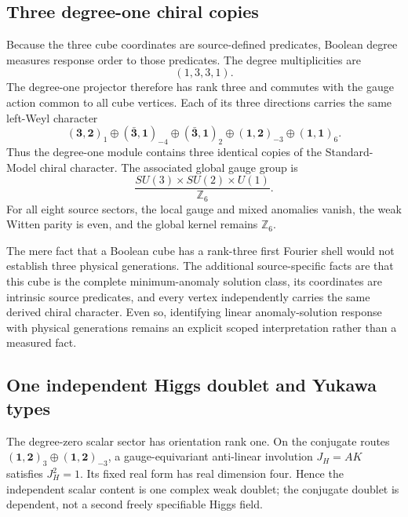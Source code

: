 \documentclass[11pt]{article}
\theoremstyle{definition}
\theoremstyle{remark}
\begin{document}
\subsection{Three degree-one chiral copies}

Because the three cube coordinates are source-defined predicates, Boolean degree measures response order to those predicates. The degree multiplicities are
\begin{equation}
 (1,3,3,1).
\end{equation}
The degree-one projector therefore has rank three and commutes with the gauge action common to all cube vertices. Each of its three directions carries the same left-Weyl character
\begin{equation}
 (\mathbf3,\mathbf2)_1
 \oplus(\bar{\mathbf3},\mathbf1)_{-4}
 \oplus(\bar{\mathbf3},\mathbf1)_2
 \oplus(\mathbf1,\mathbf2)_{-3}
 \oplus(\mathbf1,\mathbf1)_6 .
\end{equation}
Thus the degree-one module contains three identical copies of the Standard-Model chiral character. The associated global gauge group is
\begin{equation}
 \frac{SU(3)\times SU(2)\times U(1)}{\mathbb Z_6}.
\end{equation}
For all eight source sectors, the local gauge and mixed anomalies vanish, the weak Witten parity is even, and the global kernel remains $\mathbb Z_6$.

The mere fact that a Boolean cube has a rank-three first Fourier shell would not establish three physical generations. The additional source-specific facts are that this cube is the complete minimum-anomaly solution class, its coordinates are intrinsic source predicates, and every vertex independently carries the same derived chiral character. Even so, identifying linear anomaly-solution response with physical generations remains an explicit scoped interpretation rather than a measured fact.

\subsection{One independent Higgs doublet and Yukawa types}

The degree-zero scalar sector has orientation rank one. On the conjugate routes $(\mathbf1,\mathbf2)_3\oplus(\mathbf1,\mathbf2)_{-3}$, a gauge-equivariant anti-linear involution $J_H=AK$ satisfies $J_H^2=1$. Its fixed real form has real dimension four. Hence the independent scalar content is one complex weak doublet; the conjugate doublet is dependent, not a second freely specifiable Higgs field.
\end{document}
